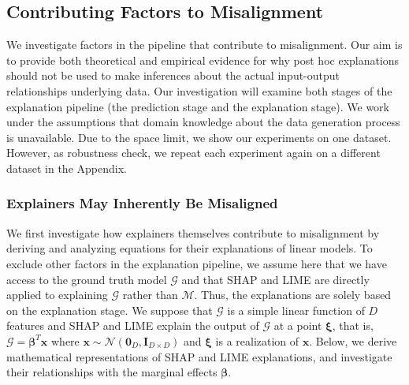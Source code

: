 \documentclass[mnsc,blindrev]{informs3}
\newcommand{\bI}{\mathbf{I}}
\begin{document}
    \subsection{Contributing Factors to  Misalignment}
        \label{sec:causes_of_misalignment}
        We investigate factors in the pipeline that contribute to misalignment. Our aim is to provide both theoretical and empirical evidence for why post hoc explanations should not be used to make inferences about the actual input-output relationships underlying data. Our investigation will examine both stages of the explanation pipeline (the prediction stage and the explanation stage). %
        We work under the assumptions that domain knowledge about the data generation process is unavailable. Due to the space limit, we show our experiments on one dataset. However, as robustness check, we repeat each experiment again on a different dataset in the Appendix. %


    \subsubsection{Explainers May Inherently Be Misaligned}
    \label{sec:theoretical_considerations}
   We first investigate how explainers themselves contribute to misalignment by deriving and analyzing equations for their explanations of linear models. To exclude other factors in the explanation pipeline, we assume here that we have access to the ground truth model $\mathcal{G}$ and that SHAP and LIME are directly applied to explaining $\mathcal{G}$ rather than $\mathcal{M}$. Thus, the explanations are solely based on the explanation stage. We suppose that $\mathcal{G}$ is a simple linear function of $D$ features and SHAP and LIME explain the output of $\mathcal{G}$ at a point $\boldsymbol{\xi}$, that is, $\mathcal{G} = \boldsymbol{\beta}^T \mathbf{x}$ where $\mathbf{x} \sim \mathcal{N}(\mathbf{0}_D,\bI_{D\times D})$ and $\boldsymbol{\xi}$ is a realization of $\mathbf{x}$. Below, we derive mathematical representations of SHAP and LIME explanations, and investigate their relationships with the marginal effects $\boldsymbol{\beta}$.
\end{document}
